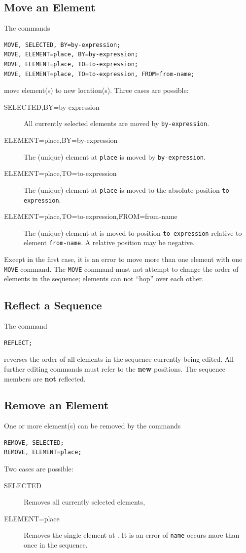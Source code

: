 \subsection{Move an Element}
\label{sec:editmove}
The commands
\begin{verbatim}
MOVE, SELECTED, BY=by-expression;
MOVE, ELEMENT=place, BY=by-expression;
MOVE, ELEMENT=place, TO=to-expression;
MOVE, ELEMENT=place, TO=to-expression, FROM=from-name;
\end{verbatim}
move element(s) to new location(s).
Three cases are possible:
\begin{description}
\item[SELECTED,BY=by-expression]
  All currently selected elements are moved by \texttt{by-expression}.
\item[ELEMENT=place,BY=by-expression]
  The (unique) element at \texttt{place} is moved by \texttt{by-expression}.
\item[ELEMENT=place,TO=to-expression]
  The (unique) element at \texttt{place} is moved to the absolute position 
  \texttt{to-expression}.
\item[ELEMENT=place,TO=to-expression,FROM=from-name]
  The (unique) element at  is moved to
  position \texttt{to-expression} relative to element
  \texttt{from-name}.  A relative position may be negative.
\end{description}
Except in the first case, it is an error to move more than one element
with one \texttt{MOVE} command.
The \texttt{MOVE} command must not attempt to change the order of
elements in the sequence;
elements can not ``hop'' over each other.

\subsection{Reflect a Sequence}
\label{sec:editreflect}
The command
\begin{verbatim}
REFLECT;
\end{verbatim}
reverses the order of all elements in the sequence currently being
edited.
All further editing commands must refer to the \textbf{new} positions.
The sequence members are \textbf{not} reflected.

\subsection{Remove an Element}
\label{sec:editremove}
One or more element(s) can be removed by the commands
\begin{verbatim}
REMOVE, SELECTED;
REMOVE, ELEMENT=place;
\end{verbatim}
Two cases are possible:
\begin{description}
\item[SELECTED]
  Removes all currently selected elements,
\item[ELEMENT=place]
  Removes the single element at .
  It is an error of \texttt{name} occurs more than once in the sequence.
\end{description}

